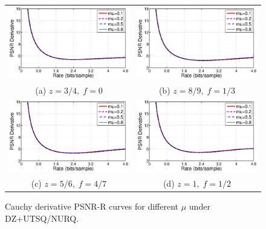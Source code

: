 \documentclass[smallabstract,smallcaptions]{dccpaper}
\begin{document}
\begin{figure}[tp]
\begin{center}
\begin{tabular}{cc}
\includegraphics[width = 0.5\linewidth]{Figures/section3/RDDerivative_Cauchy_z=0_75_p=0} &
\includegraphics[width = 0.5\linewidth]{Figures/section3/RDDerivative_Cauchy_z=0_89_p=0_33} \\
{\small (a) $z=3/4,\;f=0$} & {\small (b) $z=8/9,\;f=1/3$} \\
\includegraphics[width = 0.5\linewidth]{Figures/section3/RDDerivative_Cauchy_z=1_2_p=0_57} &
\includegraphics[width = 0.5\linewidth]{Figures/section3/RDDerivative_Cauchy_z=1_p=0_5} \\
{\small (c) $z=5/6,\;f=4/7$} & {\small (d) $z=1,\;f=1/2$} 
\end{tabular}
\end{center}
\vspace{-20pt}
\caption{\label{fig:RDDerivative_mu}
Cauchy derivative PSNR-R curves for different $\mu$ under DZ+UTSQ/NURQ.}
\end{figure} 
\end{document}
